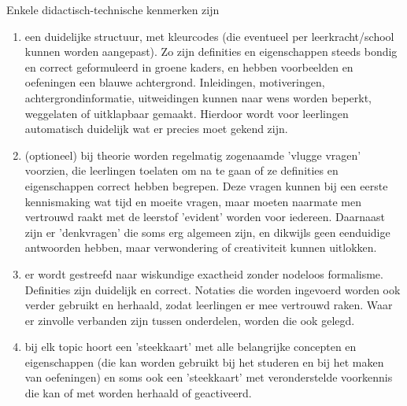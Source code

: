 \documentclass{ximera}
\begin{document}
    Enkele didactisch-technische kenmerken zijn
    \begin{enumerate}
        \item een duidelijke structuur, met kleurcodes (die eventueel per leerkracht/school kunnen worden aangepast). Zo zijn definities en eigenschappen steeds bondig en correct geformuleerd in groene kaders, en hebben voorbeelden en oefeningen een blauwe achtergrond. Inleidingen, motiveringen, achtergrondinformatie, uitweidingen kunnen naar wens worden beperkt, weggelaten of uitklapbaar gemaakt. Hierdoor wordt voor leerlingen automatisch duidelijk wat er precies moet gekend zijn.
        \item (optioneel) bij theorie worden regelmatig zogenaamde 'vlugge vragen' voorzien, die leerlingen toelaten om na te gaan of ze definities en eigenschappen correct hebben begrepen. Deze vragen kunnen bij een eerste kennismaking wat tijd en moeite vragen, maar moeten naarmate men vertrouwd raakt met de leerstof 'evident' worden voor iedereen. Daarnaast zijn er 'denkvragen' die soms erg algemeen zijn, en dikwijls geen eenduidige antwoorden hebben, maar verwondering of creativiteit kunnen uitlokken.
        \item er wordt gestreefd naar wiskundige exactheid zonder nodeloos formalisme. Definities zijn duidelijk en correct. Notaties die worden ingevoerd worden ook verder gebruikt en herhaald, zodat leerlingen er mee vertrouwd raken. Waar er zinvolle verbanden zijn tussen onderdelen, worden die ook gelegd.
        \item bij elk topic hoort een 'steekkaart' met alle belangrijke concepten en eigenschappen (die kan worden gebruikt bij het studeren en bij het maken van oefeningen)
        en soms ook  een 'steekkaart' met veronderstelde voorkennis die kan of met worden herhaald of geactiveerd. 
    \end{enumerate}
\end{document}
